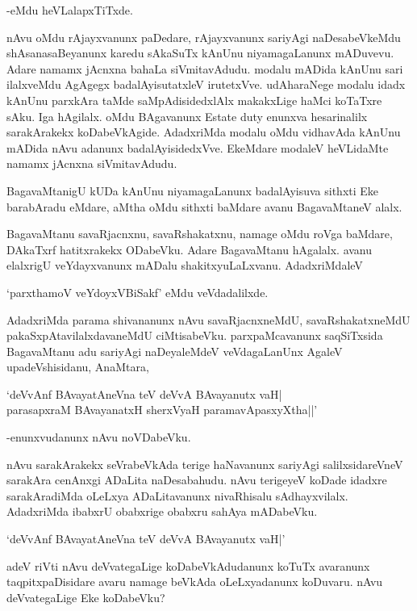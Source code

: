-eMdu heVLalapxTiTxde.

nAvu oMdu rAjayxvanunx paDedare, rAjayxvanunx sariyAgi naDesabeVkeMdu shAsanasaBeyanunx karedu sAkaSuTx kAnUnu niyamagaLanunx mADuvevu. Adare namamx jAcnxna bahaLa siVmitavAdudu. modalu mADida kAnUnu sari ilalxveMdu AgAgegx badalAyisutatxleV irutetxVve. udAharaNege modalu idadx kAnUnu parxkAra taMde saMpAdisidedxlAlx makakxLige haMci koTaTxre sAku. Iga hAgilalx. oMdu BAgavanunx {\eng Estate duty} enunxva hesarinalilx sarakArakekx koDabeVkAgide. AdadxriMda modalu oMdu vidhavAda kAnUnu mADida nAvu adanunx badalAyisidedxVve. EkeMdare modaleV heVLidaMte namamx jAcnxna siVmitavAdudu.

BagavaMtanigU kUDa kAnUnu niyamagaLanunx badalAyisuva sithxti Eke barabAradu eMdare, aMtha oMdu sithxti baMdare avanu BagavaMtaneV alalx. 

BagavaMtanu savaRjacnxnu, savaRshakatxnu, namage oMdu roVga baMdare, DAkaTxrf hatitxrakekx ODabeVku. Adare BagavaMtanu hAgalalx. avanu elalxrigU veYdayxvanunx mADalu shakitxyuLaLxvanu. AdadxriMdaleV

\begin{shloka}
`parxthamoV veYdoyxVBiSakf' eMdu veVdadalilxde.
\end{shloka}

AdadxriMda parama shivananunx nAvu savaRjacnxneMdU, savaRshakatxneMdU pakaSxpAtavilalxdavaneMdU ciMtisabeVku. parxpaMcavanunx saqSiTxsida BagavaMtanu adu sariyAgi naDeyaleMdeV veVdagaLanUnx AgaleV upadeVshisidanu, AnaMtara,

\begin{shloka}
`deVvAnf BAvayatAneVna teV deVvA BAvayanutx vaH|\\
parasapxraM BAvayanatxH sherxVyaH paramavApasxyXtha||'
\end{shloka}

-enunxvudanunx nAvu noVDabeVku.

nAvu sarakArakekx seVrabeVkAda terige haNavanunx sariyAgi salilxsidareVneV sarakAra cenAnxgi ADaLita naDesabahudu. nAvu terigeyeV koDade idadxre sarakAradiMda oLeLxya ADaLitavanunx nivaRhisalu sAdhayxvilalx. AdadxriMda ibabxrU obabxrige obabxru sahAya mADabeVku.

\begin{shloka}
`deVvAnf BAvayatAneVna teV deVvA BAvayanutx vaH|'
\end{shloka}

adeV riVti nAvu deVvategaLige koDabeVkAdudanunx koTuTx avaranunx taqpitxpaDisidare avaru namage beVkAda oLeLxyadanunx koDuvaru. nAvu deVvategaLige Eke koDabeVku?

